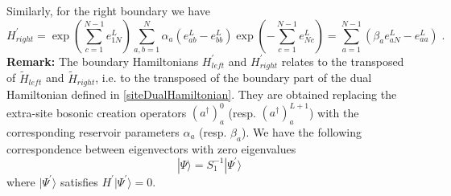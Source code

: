 \documentclass[10pt]{article}
\numberwithin{equation}{section}
\numberwithin{equation}{subsection}
\newcommand{\dt}{\;.}
\begin{document}
Similarly, for the right boundary we have 
\begin{equation}
H_{right}^{'}=\exp{\left(\sum_{c=1}^{N-1}e_{1N}^{L}\right)}\sum_{a,b=1}^{N}\alpha_{a}\left(e_{ab}^{L}-e_{bb}^{L}\right)\exp{\left(-\sum_{c=1}^{N-1}e_{Nc}^{L}\right)}=\sum_{a=1}^{N-1}\left(\beta_{a}e_{aN}^{L}-e_{aa}^{L}\right)\dt
\end{equation}
\textbf{Remark:} The boundary Hamiltonians $H_{left}^{'}$ and $H_{right}^{'}$ relates to the transposed of  $\widetilde{H}_{left}$ and $\widetilde{H}_{right}$, i.e. to the transposed of the boundary part of the dual Hamiltonian  defined in \eqref{siteDualHamiltonian}. They are obtained replacing the  extra-site bosonic creation operators $(a^{\dagger})_{a}^{0}$  (resp. $(a^{\dagger})_{a}^{L+1}$) with the corresponding reservoir parameters $\alpha_a$ (resp. $\beta_a$).
\newline\newline
We have the following correspondence between eigenvectors with zero eigenvalues
\begin{equation}\label{S1-Inverse}
	|\Psi\rangle =S_{1}^{-1}|\Psi^{'}\rangle
\end{equation}
where $|\Psi^{'}\rangle$ satisfies $H^{'}|\Psi^{'}\rangle=0$.
\end{document}
